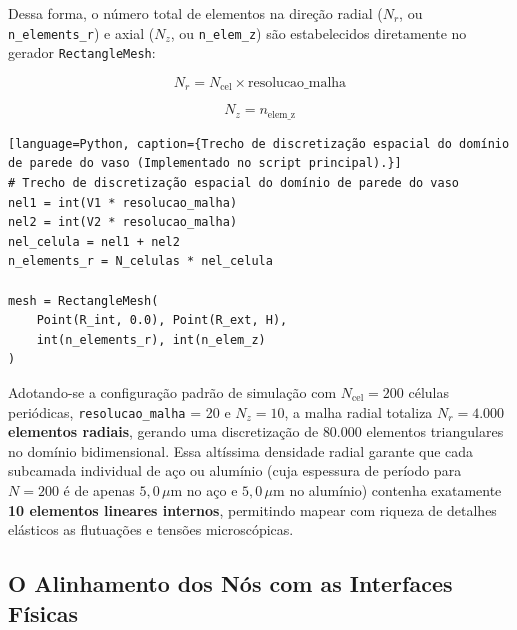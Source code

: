 Dessa forma, o número total de elementos na direção radial ($N_r$, ou \texttt{n\_elements\_r}) e axial ($N_z$, ou \texttt{n\_elem\_z}) são estabelecidos diretamente no gerador \texttt{RectangleMesh}:

\begin{equation}
  N_r = N_{\text{cel}} \times \text{resolucao\_malha}
  \label{eq:nr_mef_v3}
\end{equation}

\begin{equation}
  N_z = n_{\text{elem\_z}}
  \label{eq:nz_mef_v3}
\end{equation}

\begin{verbatim}[language=Python, caption={Trecho de discretização espacial do domínio de parede do vaso (Implementado no script principal).}]
# Trecho de discretização espacial do domínio de parede do vaso
nel1 = int(V1 * resolucao_malha)
nel2 = int(V2 * resolucao_malha)
nel_celula = nel1 + nel2
n_elements_r = N_celulas * nel_celula

mesh = RectangleMesh(
    Point(R_int, 0.0), Point(R_ext, H),
    int(n_elements_r), int(n_elem_z)
) 
\end{verbatim}


Adotando-se a configuração padrão de simulação com $N_{\text{cel}} = 200$ células periódicas, \texttt{resolucao\_malha} = 20 e $N_z = 10$, a malha radial totaliza \textbf{$N_r = 4.000$ elementos radiais}, gerando uma discretização de $80.000$ elementos triangulares no domínio bidimensional. Essa altíssima densidade radial garante que cada subcamada individual de aço ou alumínio (cuja espessura de período para $N=200$ é de apenas $5,0 \, \mu\text{m}$ no aço e $5,0 \, \mu\text{m}$ no alumínio) contenha exatamente \textbf{10 elementos lineares internos}, permitindo mapear com riqueza de detalhes elásticos as flutuações e tensões microscópicas.

\subsection{O Alinhamento dos Nós com as Interfaces Físicas}



